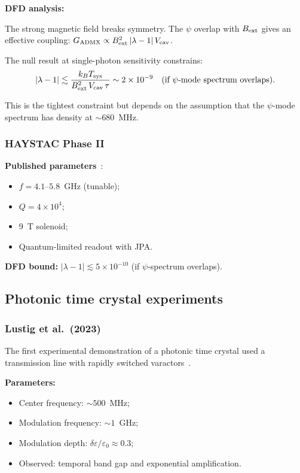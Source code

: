 \documentclass[12pt,aps,prd,twocolumn,superscriptaddress,nofootinbib]{revtex4-2}
\begin{document}
\textbf{DFD analysis:}

The strong magnetic field breaks symmetry.  The $\psi$ overlap
with $B_{\rm ext}$ gives an effective coupling:
$G_{\rm ADMX} \propto B_{\rm ext}^2\,|\lambda-1|\,V_{\rm cav}$.

The null result at single-photon sensitivity constrains:
\begin{equation}
|\lambda-1| \lesssim \frac{k_B T_{\rm sys}}{B_{\rm ext}^2\,V_{\rm cav}\,\tau}
\sim 2\times10^{-9}
\quad\text{(if $\psi$-mode spectrum overlaps)}.
\label{eq:admx_bound}
\end{equation}

This is the tightest constraint but depends on the assumption
that the $\psi$-mode spectrum has density at $\sim680$~MHz.

\subsubsection{HAYSTAC Phase II}
\label{sec:haystac}

\textbf{Published parameters}~\cite{Backes2021}:
\begin{itemize}[noitemsep]
\item $f = 4.1$--$5.8$~GHz (tunable);
\item $Q = 4\times10^4$;
\item 9~T solenoid;
\item Quantum-limited readout with JPA.
\end{itemize}

\textbf{DFD bound:}
$|\lambda-1| \lesssim 5\times10^{-10}$
(if $\psi$-spectrum overlaps).

\subsection{Photonic time crystal experiments}

\subsubsection{Lustig et al.\ (2023)}
\label{sec:lustig}

The first experimental demonstration of a photonic time crystal
used a transmission line with rapidly switched varactors~\cite{Lustig2023}.

\textbf{Parameters:}
\begin{itemize}[noitemsep]
\item Center frequency: $\sim 500$~MHz;
\item Modulation frequency: $\sim 1$~GHz;
\item Modulation depth: $\delta\varepsilon/\varepsilon_0 \approx 0.3$;
\item Observed: temporal band gap and exponential amplification.
\end{itemize}
\end{document}
